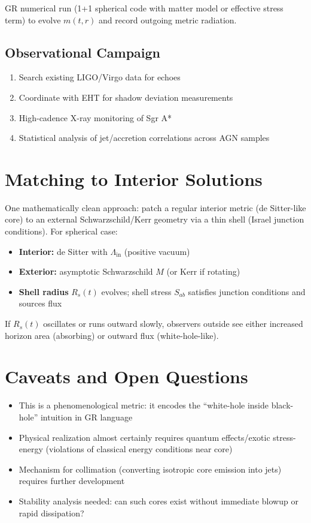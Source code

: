 \documentclass[11pt,a4paper]{article}
\begin{document}
GR numerical run (1+1 spherical code with matter model or effective stress term) to evolve $m(t,r)$ and record outgoing metric radiation.

\subsection{Observational Campaign}

\begin{enumerate}
\item Search existing LIGO/Virgo data for echoes
\item Coordinate with EHT for shadow deviation measurements
\item High-cadence X-ray monitoring of Sgr A*
\item Statistical analysis of jet/accretion correlations across AGN samples
\end{enumerate}

\section{Matching to Interior Solutions}

One mathematically clean approach: patch a regular interior metric (de Sitter-like core) to an external Schwarzschild/Kerr geometry via a thin shell (Israel junction conditions). For spherical case:

\begin{itemize}
\item \textbf{Interior:} de Sitter with $\Lambda_{\text{in}}$ (positive vacuum)
\item \textbf{Exterior:} asymptotic Schwarzschild $M$ (or Kerr if rotating)
\item \textbf{Shell radius} $R_s(t)$ evolves; shell stress $S_{ab}$ satisfies junction conditions and sources flux
\end{itemize}

If $R_s(t)$ oscillates or runs outward slowly, observers outside see either increased horizon area (absorbing) or outward flux (white-hole-like).

\section{Caveats and Open Questions}

\begin{itemize}
\item This is a phenomenological metric: it encodes the ``white-hole inside black-hole'' intuition in GR language
\item Physical realization almost certainly requires quantum effects/exotic stress-energy (violations of classical energy conditions near core)
\item Mechanism for collimation (converting isotropic core emission into jets) requires further development
\item Stability analysis needed: can such cores exist without immediate blowup or rapid dissipation?
\end{itemize}
\end{document}
